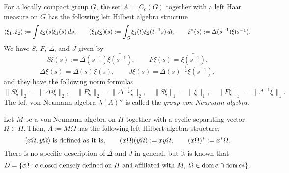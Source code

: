 \documentclass{../../small}
\begin{document}
\begin{ex}
For a locally compact group $G$, the set $A:=C_c(G)$ together with a left Haar measure on $G$ has the following left Hilbert algebra structure
\[\langle\xi_1,\xi_2\rangle:=\int\overline{\xi_2(s)}\xi_1(s)\,ds,\qquad(\xi_1\xi_2)(s):=\int_G\xi_1(t)\xi_2(t^{-1}s)\,dt,\qquad\xi^*(s):=\Delta(s^{-1})\overline{\xi(s^{-1})}.\]
We have $S$, $F$, $\Delta$, and $J$ given by
\[S\xi(s):=\Delta(s^{-1})\bar{\xi(s^{-1})},\qquad F\xi(s)=\bar{\xi(s^{-1})},\]
\[\Delta\xi(s)=\Delta(s)\xi(s),\qquad J\xi(s)=\Delta(s)^{-\frac12}\bar{\xi(s^{-1})},\]
and they have the following norm formulas
\[\|S\xi\|_2=\|\Delta^{\frac12}\xi\|_2,\quad\|F\xi\|_2=\|\Delta^{-\frac12}\xi\|_2,\quad\|S\xi\|_1=\|\xi\|_1,\quad\|F\xi\|_1=\|\Delta^{-1}\xi\|_1.\]
The left von Neumann algebra $\lambda(A)''$ is called the \emph{group von Neumann algebra}.
\iffalse
The left involution $S$ is an isometric anti-linear automorphism of $L^1(G)=L^1(G,ds)$, but the right involution $F$ defines an isometric anti-linear isomorphism between $L^1(G,ds)$ and $L^1(G,ds^{-1})$.
To sum up,
\[\begin{array}{lrl}
\xi\in H &\Leftrightarrow& \|\xi\|_2<\infty,\\
\xi\in D &\Leftrightarrow& \|S\xi\|_2+\|\xi\|_2<\infty,\\
\xi\in A &\Rightarrow& \|\lambda(\xi)\|+\|S\xi\|_2+\|\xi\|_2<\infty,\\
\xi\in B' &\Leftrightarrow& \|\rho(\xi)\|+\|\xi\|_2<\infty,\\
\xi\in D' &\Leftrightarrow& \|F\xi\|_2+\|\xi\|_2<\infty,\\
\xi\in A' &\Leftrightarrow& \|\rho(\xi)\|+\|F\xi\|_2+\|\xi\|_2<\infty,\\
\xi\in B &\Leftrightarrow& \|\lambda(\xi)\|+\|\xi\|_2<\infty,\\
\xi\in A'' &\Leftrightarrow& \|\lambda(\xi)\|+\|S\xi\|_2+\|\xi\|_2<\infty.
\end{array}\]
\fi
\end{ex}


\begin{ex}
Let $M$ be a von Neumann algebra on $H$ together with a cyclic separating vector $\Omega\in H$.
Then, $A:=M\Omega$ has the following left Hilbert algebra structure:
\[\langle x\Omega,y\Omega\rangle\text{ is defined as it is},\qquad (x\Omega)(y\Omega):=xy\Omega,\qquad (x\Omega)^*:=x^*\Omega.\]
There is no specific description of $\Delta$ and $J$ in general, but it is known that
\[D=\{c\Omega:c\text{ closed densely defined on $H$ and affiliated with $M$},\ \Omega\in\operatorname{dom} c\cap\operatorname{dom} c*\}.\]
\end{ex}
\end{document}
